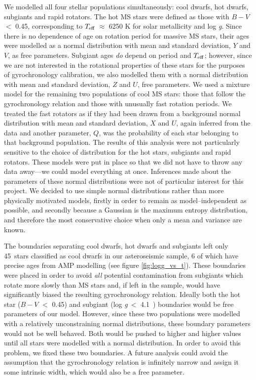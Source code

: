\documentclass[11pt,preprint]{aastex}
\newcommand{\logg}{log \emph{g}}
\newcommand{\teff}{$T_{\rm{eff}}$}
\newcommand{\ncooldwarfs}{45~}
\newcommand{\subcut}{4.1~}
\begin{document}
We modelled all four stellar populations simultaneously: cool dwarfs, hot dwarfs, subgiants and rapid rotators.
The hot MS stars were defined as those with $B-V$ $<$ 0.45, corresponding to \teff$~\approx$ 6250 K for solar metallicity and \logg.
Since there is no dependence of age on rotation period for massive MS stars, their ages were modelled as a normal distribution with mean and standard deviation, $Y$ and $V$, as free parameters.
Subgiant ages \emph{do} depend on period and $T_{\rm{eff}}$; however, since we are not interested in the rotational properties of these stars for the purposes of gyrochronology calibration, we also modelled them with a normal distribution with mean and standard deviation, $Z$ and $U$, free parameters.
We used a mixture model for the remaining two populations of cool MS stars: those that follow the gyrochronology relation and those with unusually fast rotation periods.
We treated the fast rotators as if they had been drawn from a background normal distribution with mean and standard deviation, $X$ and $U$, again inferred from the data and another parameter, $Q$, was the probability of each star belonging to that background population.
The results of this analysis were not particularly sensitive to the choice of distribution for the hot stars, subgiants and rapid rotators.
These models were put in place so that we did not have to throw any data away---we could model everything at once.
Inferences made about the parameters of these normal distributions were not of particular interest for this project.
We decided to use simple normal distributions rather than more physically motivated models, firstly in order to remain as model--independent as possible, and secondly because a Gaussian is the maximum entropy distribution, and therefore the most conservative choice when only a mean and variance are known.

The boundaries separating cool dwarfs, hot dwarfs and subgiants left only \ncooldwarfs stars classified as cool dwarfs in our asteroseismic sample, 6 of which have precise ages from AMP modelling (see figure \ref{fig:logg_vs_t}).
These boundaries were placed in order to avoid {\it all} potential contamination from subgiants which rotate more slowly than MS stars and, if left in the sample, would have significantly biased the resulting gyrochronology relation.
Ideally both the hot star ($B-V$ $<$ 0.45) and subgiant (\logg$~<$ \subcut) boundaries would be free parameters of our model.
However, since these two populations were modelled with a relatively unconstraining normal distributions, these boundary parameters would not be well behaved.
Both would be pushed to higher and higher values until all stars were modelled with a normal distribution.
In order to avoid this problem, we fixed these two boundaries.
A future analysis could avoid the assumption that the gyrochronology relation is infinitely narrow and assign it some intrinsic width, which would also be a free parameter.
\end{document}
